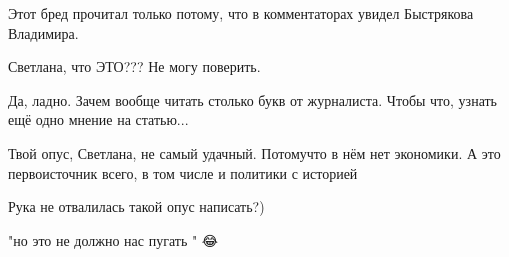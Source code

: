 \begin{itemize}
 
Этот бред прочитал только потому, что в комментаторах увидел Быстрякова Владимира.

 
Светлана, что ЭТО??? Не могу поверить.

 
Да, ладно. Зачем вообще читать столько букв от журналиста. Чтобы что, узнать ещё одно мнение на статью...

 
Твой опус, Светлана, не самый удачный. Потомучто в нём нет экономики. А это первоисточник всего, в том числе и политики с историей

 
Рука не отвалилась такой опус написать?)

 
"но это не должно нас пугать " 😂

 

\end{itemize}
